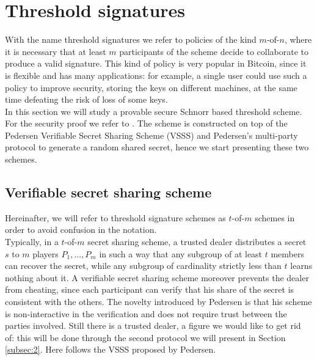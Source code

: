 \section{Threshold signatures}
\label{threshold}
With the name threshold signatures we refer to policies of the kind $m$-of-$n$, where it is necessary that at least $m$ participants of the scheme decide to collaborate to produce a valid signature. This kind of policy is very popular in Bitcoin, since it is flexible and has many applications: for example, a single user could use such a policy to improve security, storing the keys on different machines, at the same time defeating the risk of loss of some keys. 
\\
In this section we will study a provable secure Schnorr based threshold scheme. For the security proof we refer to \cite{RefWork:14}. The scheme is constructed on top of the Pedersen Verifiable Secret Sharing Scheme (VSSS) and Pedersen's multi-party protocol to generate a random shared secret, hence we start presenting these two schemes.

\bigskip

\subsection{Verifiable secret sharing scheme}
\label{subsec:1}
Hereinafter, we will refer to threshold signature schemes as $t$-of-$m$ schemes in order to avoid confusion in the notation.
\\
Typically, in a $t$-of-$m$ secret sharing scheme, a trusted dealer distributes a secret $s$ to $m$ players $P_1, ..., P_m$ in such a way that any subgroup of at least $t$ members can recover the secret, while any subgroup of cardinality strictly less than $t$ learns nothing about it. A verifiable secret sharing scheme moreover prevents the dealer from cheating, since each participant can verify that his share of the secret is consistent with the others. The novelty introduced by Pedersen is that his scheme is non-interactive in the verification and does not require trust between the parties involved. Still there is a trusted dealer, a figure we would like to get rid of: this will be done through the second protocol we will present in Section \ref{subsec:2}. Here follows the VSSS proposed by Pedersen.

